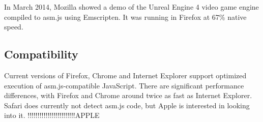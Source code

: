 In March 2014, Mozilla showed a demo of the Unreal Engine 4 video game engine compiled to asm.js using Emscripten. It was running in Firefox at 67\% native speed. \cite{ue4ff}


\subsection{Compatibility}

Current versions of Firefox, Chrome and Internet Explorer support optimized execution of asm.js-compatible JavaScript. There are significant performance differences, with Firefox and Chrome around twice as fast as Internet Explorer. Safari does currently not detect asm.js code, but Apple is interested in looking into it. \cite{asm.js_comp} !!!!!!!!!!!!!!!!!!!!!!!!APPLE
